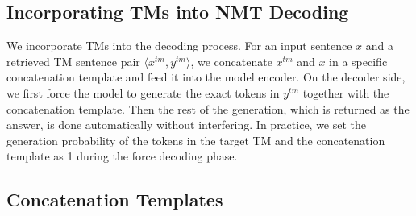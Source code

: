 \documentclass[letterpaper]{article} %
\begin{document}
\subsection{Incorporating TMs into NMT Decoding}

We incorporate TMs into the decoding process. For an input sentence $x$ and a retrieved TM sentence pair $\langle x^{tm},y^{tm}\rangle$, we concatenate $x^{tm}$ and $x$ in a specific concatenation template and feed it into the model encoder. On the decoder side, we first force the model to generate the exact tokens in $y^{tm}$ together with the concatenation template. Then the rest of the generation, which is returned as the answer, is done automatically without interfering. In practice, we set the generation probability of the tokens in the target TM and the concatenation template as 1 during the force decoding phase.

\subsection{Concatenation Templates}
\end{document}
